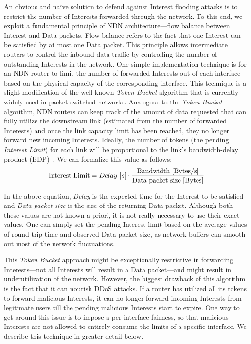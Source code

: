 \documentclass[10pt,conference]{IEEEtran}
\begin{document}

An obvious and na\"ive solution to defend against Interest flooding attacks is to restrict the number of Interests forwarded through the network. To this end, we exploit a 
 fundamental principle of NDN architecture---flow balance between Interest and Data packets. Flow balance refers to the fact that one Interest can be satisfied by at most one Data packet. This principle allows intermediate routers to control the inbound data traffic by controlling the number of outstanding Interests in the network. 
One simple implementation technique  is for an NDN router to limit the number of forwarded Interests out of each interface based on the physical capacity of the corresponding interface. This technique is a slight modification of the well-known {\it Token Bucket} algorithm that is currently widely used in packet-switched networks. Analogous to the {\it Token Bucket} algorithm, NDN routers can keep track of the amount of data requested that can fully utilize the downstream link (estimated from the number of forwarded Interests) and once the link capacity limit has been reached, they no longer forward new incoming Interests. Ideally, the number of tokens (the pending \emph{Interest Limit}) for each link will be proportional to the link's bandwidth-delay product (BDP)~\cite{tcp-survey}. We can formalize this value as follows:
%
\begin{equation}
\label{eq:interest limit}
\small \mathrm{Interest\ Limit} = Delay\ [s] \cdot \frac{\mathrm{Bandwidth\ [Bytes/s]}}{\mathrm{Data\ packet\ size\ [Bytes]}}
\end{equation}

In the above equation, \emph{Delay} is the expected time for the Interest to be satisfied and \emph{Data packet size} is the size of the returning Data packet.
Although both these values are not known a priori, it is not really necessary to use their exact values.
One can simply set the pending Interest limit based on the average values of round trip time and observed Data packet size, as network buffers can smooth out most of the network fluctuations.

This {\it Token Bucket} approach might be exceptionally restrictive in forwarding Interests---not all Interests will result in a Data packet---and might result in underutilization of the network. However, the biggest drawback of this algorithm is the fact that it can nourish DDoS attacks. If a router has utilized all its tokens to forward malicious Interests, it can no longer forward incoming Interests from legitimate users till the pending malicious Interests start to expire. One way to get around this issue is to impose a per interface fairness, so that malicious Interests are not allowed to entirely consume the limits of a specific interface. We describe this technique in greater detail below.
\end{document}
